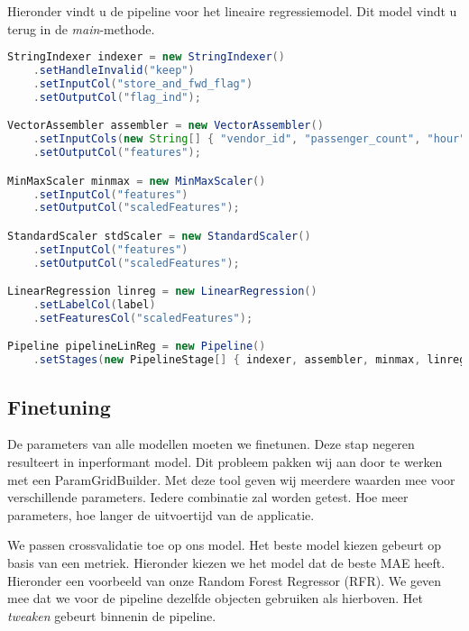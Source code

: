\documentclass[a4paper,10pt,twoside]{report}
\begin{document}
Hieronder vindt u de pipeline voor het lineaire regressiemodel. Dit model vindt u terug in de \textit{main}-methode.

\begin{lstlisting}[language=Java]
StringIndexer indexer = new StringIndexer()
	.setHandleInvalid("keep")
	.setInputCol("store_and_fwd_flag")
	.setOutputCol("flag_ind");

VectorAssembler assembler = new VectorAssembler()
	.setInputCols(new String[] { "vendor_id", "passenger_count", "hour", "day", "flag_ind", "distance" })
	.setOutputCol("features");

MinMaxScaler minmax = new MinMaxScaler()
	.setInputCol("features")
	.setOutputCol("scaledFeatures");

StandardScaler stdScaler = new StandardScaler()
	.setInputCol("features")
	.setOutputCol("scaledFeatures");

LinearRegression linreg = new LinearRegression()
	.setLabelCol(label)
	.setFeaturesCol("scaledFeatures");

Pipeline pipelineLinReg = new Pipeline()
	.setStages(new PipelineStage[] { indexer, assembler, minmax, linreg });
\end{lstlisting}

\newpage

\subsection*{Finetuning}

De parameters van alle modellen moeten we finetunen. Deze stap negeren resulteert in inperformant model. Dit probleem pakken wij aan door te werken met een ParamGridBuilder. Met deze tool geven wij meerdere waarden mee voor verschillende parameters. Iedere combinatie zal worden getest. Hoe meer parameters, hoe langer de uitvoertijd van de applicatie. 

We passen crossvalidatie toe op ons model. Het beste model kiezen gebeurt op basis van een metriek. Hieronder kiezen we het model dat de beste MAE heeft. Hieronder een voorbeeld van onze Random Forest Regressor (RFR). We geven mee dat we voor de pipeline dezelfde objecten gebruiken als hierboven. Het \textit{tweaken} gebeurt binnenin de pipeline.
\end{document}
